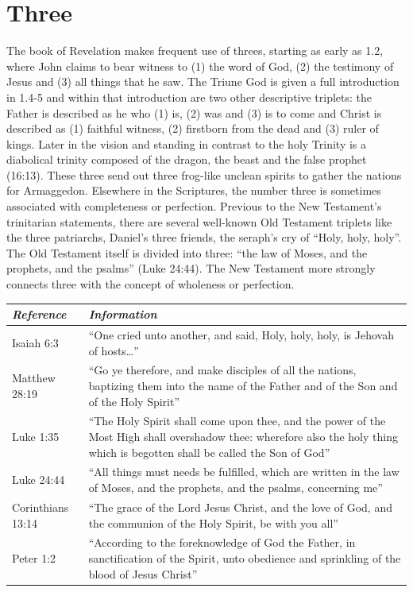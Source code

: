 \section*{Three}
The book of Revelation makes frequent use of threes, starting as early as 1.2, where John claims to bear witness to (1) the word of God, (2) the testimony of Jesus and (3) all things that he saw. The Triune God is given a full introduction in 1.4-5 and within that introduction are two other descriptive triplets: the Father is described as he who (1) is, (2) was and (3) is to come and Christ is described as (1) faithful witness, (2) firstborn from the dead and (3) ruler of kings. Later in the vision and standing in contrast to the holy Trinity is a diabolical trinity composed of the dragon, the beast and the false prophet (16:13). These three send out three frog-like unclean spirits to gather the nations for Armaggedon.
\newline\newline
Elsewhere in the Scriptures, the number three is sometimes associated with completeness or perfection. Previous to the New Testament's trinitarian statements, there are several well-known Old Testament triplets like the three patriarchs, Daniel's three friends, the seraph's cry of ``Holy, holy, holy''. The Old Testament itself is divided into three: ``the law of Moses, and the prophets, and the psalms'' (Luke 24:44). The New Testament more strongly connects three with the concept of wholeness or perfection.  
\newline\newline
\begin{tabularx}{\textwidth}{l X}
\toprule
\rowcolor{headergray}\emph{Reference} & \emph{Information}\\ 
\midrule
Isaiah 6:3 & ``One cried unto another, and said, Holy, holy, holy, is Jehovah of hosts\ldots'' \\
\addlinespace
Matthew 28:19 & ``Go ye therefore, and make disciples of all the nations, baptizing them into the name of the Father and of the Son and of the Holy Spirit'' \\
\addlinespace
Luke 1:35 &  ``The Holy Spirit shall come upon thee, and the power of the Most High shall overshadow thee: wherefore also the holy thing which is begotten shall be called the Son of God'' \\
\addlinespace
Luke 24:44 & ``All things must needs be fulfilled, which are written in the law of Moses, and the prophets, and the psalms, concerning me'' \\
\addlinespace
2 Corinthians 13:14 & ``The grace of the Lord Jesus Christ, and the love of God, and the communion of the Holy Spirit, be with you all'' \\
\addlinespace
1 Peter 1:2 & ``According to the foreknowledge of God the Father, in sanctification of the Spirit, unto obedience and sprinkling of the blood of Jesus Christ'' \\
\bottomrule
\end{tabularx}

